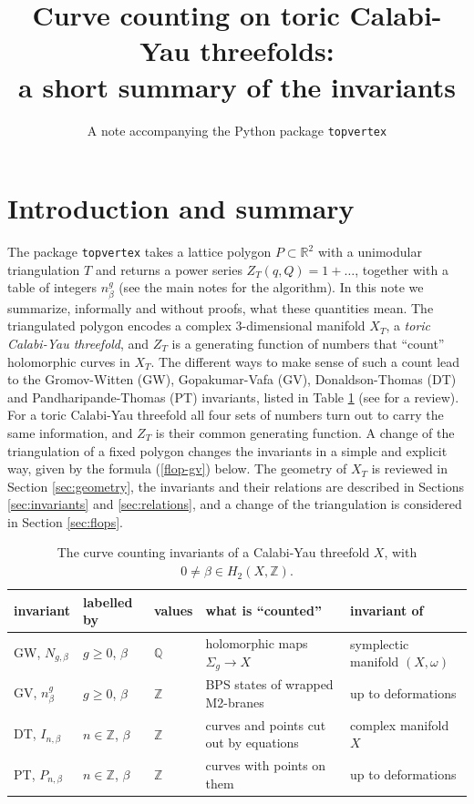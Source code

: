 \documentclass[11pt]{article}
\title{\vspace{-2.5em}Curve counting on toric Calabi-Yau threefolds:\\ a short summary of the invariants}
\author{A note accompanying the Python package \texttt{topvertex}}
\date{\vspace{-2.5em}}
\newcommand{\Z}{\mathbb{Z}}
\newcommand{\Q}{\mathbb{Q}}
\newcommand{\R}{\mathbb{R}}
\newcommand{\topvertex}{\texttt{topvertex}}
\begin{document}
\maketitle

\section{Introduction and summary}\label{sec:intro}

The package \topvertex{} takes a lattice polygon $P\subset\R^2$ with a unimodular triangulation
$T$ and returns a power series $Z_T(q,Q)=1+\ldots$, together with a table of integers $n^g_\beta$
(see the main notes \cite{notes} for the algorithm). In this note we summarize, informally and
without proofs, what these quantities mean. The triangulated polygon encodes a complex
3-dimensional manifold $X_T$, a \textit{toric Calabi-Yau threefold}, and $Z_T$ is a generating
function of numbers that ``count'' holomorphic curves in $X_T$. The different ways to make
sense of such a count lead to the Gromov-Witten (GW), Gopakumar-Vafa (GV), Donaldson-Thomas (DT)
and Pandharipande-Thomas (PT) invariants, listed in Table \ref{tab:summary} (see \cite{PT13}
for a review). For a toric Calabi-Yau threefold all
four sets of numbers turn out to carry the same information, and $Z_T$ is their common
generating function. A change of the triangulation of a fixed polygon changes the invariants in
a simple and explicit way, given by the formula (\ref{flop-gv}) below. The geometry of $X_T$ is
reviewed in Section \ref{sec:geometry}, the invariants and their relations are described in
Sections \ref{sec:invariants} and \ref{sec:relations}, and a change of the triangulation is
considered in Section \ref{sec:flops}.

\begin{table}[ht]
\centering\small
\begin{tabular}{lllll}
\toprule
invariant & labelled by & values & what is ``counted'' & invariant of \\
\midrule
GW, $N_{g,\beta}$ & $g\geq 0$, $\beta$ & $\Q$ & holomorphic maps $\Sigma_g\rightarrow X$ &
symplectic manifold $(X,\omega)$\\
GV, $n^g_\beta$ & $g\geq 0$, $\beta$ & $\Z$ & BPS states of wrapped M2-branes &
\quad up to deformations\\[2pt]
DT, $I_{n,\beta}$ & $n\in\Z$, $\beta$ & $\Z$ & curves and points cut out by equations &
complex manifold $X$\\
PT, $P_{n,\beta}$ & $n\in\Z$, $\beta$ & $\Z$ & curves with points on them &
\quad up to deformations\\
\bottomrule
\end{tabular}
\caption{The curve counting invariants of a Calabi-Yau threefold $X$, with
$0\neq\beta\in H_2(X,\Z)$.}\label{tab:summary}
\end{table}
\end{document}
